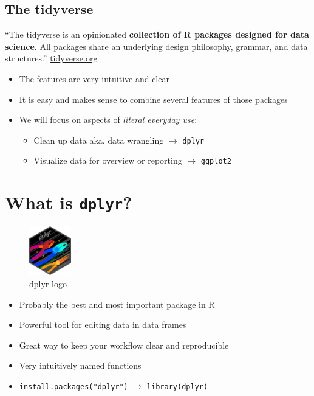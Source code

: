 \documentclass[
]{book}
\providecommand{\tightlist}{%
  \setlength{\itemsep}{0pt}\setlength{\parskip}{0pt}}
\begin{document}
\subsection{The tidyverse}\label{the-tidyverse}

``The tidyverse is an opinionated \textbf{collection of R packages designed for data science}. All packages share an underlying design philosophy, grammar, and data structures.'' \url{tidyverse.org}

\begin{itemize}
\tightlist
\item
  The features are very intuitive and clear
\item
  It is easy and makes sense to combine several features of those packages
\item
  We will focus on aspects of \emph{literal everyday use}:

  \begin{itemize}
  \tightlist
  \item
    Clean up data aka. data wrangling \(\rightarrow\) { \texttt{dplyr} }
  \item
    Visualize data for overview or reporting \(\rightarrow\) \texttt{ggplot2}
  \end{itemize}
\end{itemize}

\section{\texorpdfstring{What is \texttt{dplyr}?}{What is dplyr?}}\label{what-is-dplyr}

\begin{figure}
\centering
\includegraphics[width=\textwidth,height=0.83333in]{./img/dplyr.png}
\caption{dplyr logo}
\end{figure}

\begin{itemize}
\item
  Probably the best and most important package in R
\item
  Powerful tool for editing data in data frames
\item
  Great way to keep your workflow clear and reproducible
\item
  Very intuitively named functions
\item
  \texttt{install.packages("dplyr")} \(\rightarrow\) \texttt{library(dplyr)}
\end{itemize}
\end{document}
